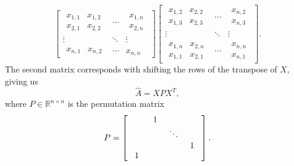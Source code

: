 \begin{equation}
\begin{bmatrix}
    \begin{matrix}
        x_{1,1} & x_{1,2} \\
        x_{2,1} & x_{2,2}
    \end{matrix}
    & \cdots &
    \begin{matrix}
        x_{1,n} \\ x_{2,n}
    \end{matrix} \\
    \vdots & \ddots & \vdots \\
    \begin{matrix}
        x_{n,1} & x_{n,2}
    \end{matrix}
    & \cdots & x_{n,n}
\end{bmatrix}
\begin{bmatrix}
    \begin{matrix}
        x_{1,2} & x_{2,2} \\
        x_{1,3} & x_{2,3}
    \end{matrix}
    & \cdots &
    \begin{matrix}
        x_{n,2} \\ x_{n,3}
    \end{matrix} \\
    \vdots & \ddots & \vdots \\
    \begin{matrix}
        x_{1,n} & x_{2,n} \\
        x_{1,1} & x_{2,1}
    \end{matrix}
    & \cdots & \begin{matrix}
        x_{n,n} \\ x_{n,1}
    \end{matrix}
\end{bmatrix}.
\end{equation}
The second matrix corresponds with shifting the rows of the transpose of $X$, giving us
\begin{equation}
    \hat{A} = X P X^T,
\end{equation}
where $P\in\mathbb{R}^{n \times n}$ is the permutation matrix
\begin{equation}
    P =
    \left[
    \begin{array}{cccc}
         &\SetToWidest{1}  \\
         && \ddots \\
         &&& \SetToWidest{1} \\
         \SetToWidest{1}
    \end{array}
    \right].
\end{equation}

